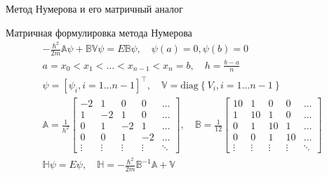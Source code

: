 \documentclass[10pt,pdf,hyperref={unicode},xcolor=dvipsnames]{beamer}
\newcommand{\lsq}{\left[}
\newcommand{\rsq}{\right]}
\newcommand{\bbA}{\mathbb{A}}
\newcommand{\bbB}{\mathbb{B}}
\newcommand{\bbV}{\mathbb{V}}
\newcommand{\bbH}{\mathbb{H}}
\begin{document}
\begin{frame}{Метод Нумерова и его матричный аналог}
    \begin{block}{}
        Матричная формулировка метода Нумерова 
        \begin{gather}
            -\frac{\hbar^2}{2 m} \bbA \psi + \bbB \bbV \psi = E \bbB \psi, \quad \psi(a) = 0, \psi(b) = 0 \\
            a = x_0 < x_1 < \dots < x_{n-1} < x_n = b, \quad h = \frac{b - a}{n} \\
            \psi = \lsq \psi_i, i = 1 \dots n - 1 \rsq^\top, \quad \bbV = \text{diag} \left\{ V_i, i = 1 \dots n - 1 \right\} \\
            \bbA = \frac{1}{h^2} 
            \begin{bmatrix}
                -2 & 1 & 0 & 0 & \dots \\
                 1 &-2 & 1 & 0 & \dots \\ 
                 0 & 1 & -2& 1 & \dots \\
                 0 & 0 & 1 & -2& \dots \\
                 \vdots & \vdots & \vdots & \vdots & \ddots
            \end{bmatrix}, \quad
            \bbB = \frac{1}{12} 
            \begin{bmatrix}
                10 & 1 & 0 & 0 & \dots \\
                1 & 10 & 1 & 0 & \dots \\
                0 & 1 & 10 & 1 & \dots \\
                0 & 0 & 1 & 10 & \dots \\
                \vdots & \vdots & \vdots & \vdots & \ddots
            \end{bmatrix} \\
            \bbH \psi = E \psi, \quad \bbH = -\frac{\hbar^2}{2m} \bbB^{-1} \bbA + \bbV
        \end{gather}
    \end{block}
\end{frame}
\end{document}

